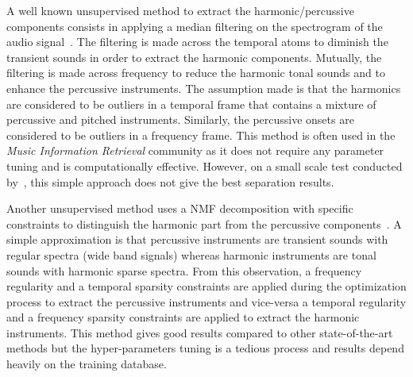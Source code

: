 
A well known unsupervised method to extract the harmonic/percussive components consists in applying a median filtering on the spectrogram of the audio signal~\cite{fitzgerald2010harmonic,ono2008separation}. The filtering is made across the temporal atoms to diminish the transient sounds in order to extract the harmonic components. Mutually, the filtering is made across frequency to reduce the harmonic tonal sounds and to enhance the percussive instruments. The assumption made is that the harmonics are considered to be outliers in a temporal frame that contains a mixture of percussive and pitched instruments. Similarly, the percussive onsets are considered to be outliers in a frequency frame. This method is often used in the \emph{Music Information Retrieval} community as it does not require any parameter tuning and is computationally effective. However, on a small scale test conducted by~\cite{canadas2014percussive}, this simple approach does not give the best separation results.%

Another unsupervised method uses a NMF decomposition with specific constraints to distinguish the harmonic part from the percussive components~\cite{canadas2014percussive}. A simple approximation is that percussive instruments are transient sounds with regular spectra (wide band signals) whereas harmonic instruments are tonal sounds with harmonic sparse spectra. From this observation, a frequency regularity and a temporal sparsity constraints are applied during the optimization process to extract the percussive instruments and vice-versa a temporal regularity and a frequency sparsity constraints are applied to extract the harmonic instruments. This method gives good results compared to other state-of-the-art methods but the hyper-parameters tuning is a tedious process and results depend heavily on the training database.

